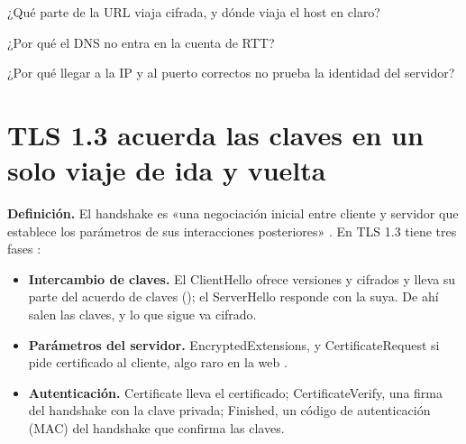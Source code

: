 \documentclass[10pt,a4paper]{article}
\begin{document}

\begin{repaso}
\item ¿Qué parte de la URL viaja cifrada, y dónde viaja el host en claro?
\item ¿Por qué el DNS no entra en la cuenta de RTT?
\item ¿Por qué llegar a la IP y al puerto correctos no prueba la identidad del servidor?
\end{repaso}

\section{TLS 1.3 acuerda las claves en un solo viaje de ida y vuelta}\label{sec:handshake}

\textbf{Definición.} El handshake es «una negociación inicial entre cliente y servidor que
establece los parámetros de sus interacciones posteriores» . En
TLS 1.3 tiene tres fases :

\begin{itemize}
\item \textbf{Intercambio de claves.} El ClientHello ofrece versiones y cifrados y lleva su
  parte del acuerdo de claves (); el ServerHello responde con la suya. De ahí
  salen las claves, y lo que sigue va cifrado.
\item \textbf{Parámetros del servidor.} EncryptedExtensions, y CertificateRequest si pide
  certificado al cliente, algo raro en la web .
\item \textbf{Autenticación.} Certificate lleva el certificado; CertificateVerify, una firma
  del handshake con la clave privada; Finished, un código de autenticación (MAC) del
  handshake que confirma las claves.
\end{itemize}
\end{document}

